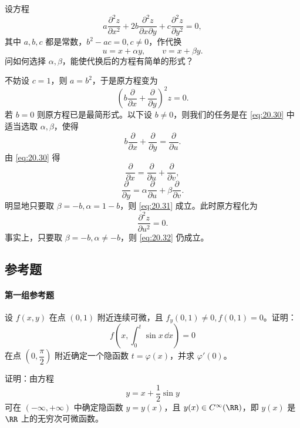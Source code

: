 \begin{xexample}[20.5.2]
设方程
\[
  a\frac{\partial^2z}{\partial x^2}
  +2b\frac{\partial^2z}{\partial x\partial y}
  +c\frac{\partial^2z}{\partial y^2}=0,
\]
其中 $a,b,c$ 都是常数，$b^2-ac=0,c\ne0$，作代换
\begin{equation}
  u=x+\alpha y,\qquad v=x+\beta y.
  \tag{20.30}
  \label{eq:20.30}
\end{equation}
问如何选择 $\alpha,\beta$，能使代换后的方程有简单的形式？
\end{xexample}
\begin{xsolution}
不妨设 $c=1$，则 $a=b^2$，于是原方程变为
\[
  \left(b\frac\partial{\partial x}+\frac\partial{\partial y}\right)^2z=0.
\]
若 $b=0$ 则原方程已是最简形式。以下设 $b\ne0$，则我们的任务是在 \eqref{eq:20.30} 中适当选取 $\alpha,\beta$，使得
\begin{equation}
  b\frac\partial{\partial x}+\frac\partial{\partial y}=\frac\partial{\partial u}.
  \tag{20.31}
  \label{eq:20.31}
\end{equation}
由 \eqref{eq:20.30} 得
\[
  \frac\partial{\partial x}=\frac\partial{\partial u}+\frac\partial{\partial v},
\]
\[
  \frac\partial{\partial y}=\alpha\frac\partial{\partial u}+\beta\frac\partial{\partial v}.
\]
明显地只要取 $\beta=-b,\alpha=1-b$，则 \eqref{eq:20.31} 成立。此时原方程化为
\begin{equation}
  \frac{\partial^2z}{\partial u^2}=0.
  \tag{20.32}
  \label{eq:20.32}
\end{equation}
事实上，只要取 $\beta=-b,\alpha\ne-b$，则 \eqref{eq:20.32} 仍成立。
\end{xsolution}

\subsection{参考题}

\paragraph{第一组参考题}

\begin{xreferenceproblem}[1]
设 $f(x,y)$ 在点 $(0,1)$ 附近连续可微，且 $f_y(0,1)\ne0,f(0,1)=0$。证明：
  \[
    f\left(x,\int_0^t\sin x\,\dd x\right)=0
  \]
  在点 $\left(0,\dfrac\pi2\right)$ 附近确定一个隐函数 $t=\varphi(x)$，并求 $\varphi'(0)$。
\end{xreferenceproblem}

\begin{xreferenceproblem}[2]
证明：由方程
  \[
    y=x+\frac12\sin y
  \]
  可在 $(-\infty,+\infty)$ 中确定隐函数 $y=y(x)$，且 $y(x)\in C^\infty(\RR)$，即 $y(x)$ 是 $\RR$ 上的无穷次可微函数。
\end{xreferenceproblem}

